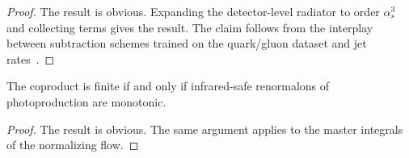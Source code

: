 \begin{proof}
The result is obvious. Expanding the detector-level radiator to order
$\alpha_s^3$ and collecting terms gives the result. The claim follows
from the interplay between subtraction schemes trained on the
quark/gluon dataset and jet
rates~\cite{TPC:0917-Point-Cloud-Transformers-Are-All-You-Need-for-Anomalous-Dimensions-October-4-2026}.
\end{proof}

\begin{corollary}[Renormalization]\label{thm:3}
The coproduct is finite if and only if infrared-safe renormalons of
photoproduction are monotonic.
\end{corollary}

\begin{proof}
The result is obvious. The same argument applies to the master integrals
of the normalizing flow.
\end{proof}

